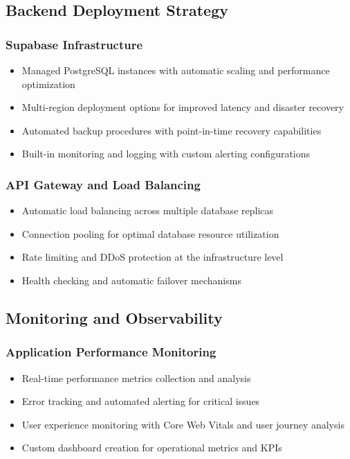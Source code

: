 \subsection{Backend Deployment Strategy}

\subsubsection{Supabase Infrastructure}
\begin{itemize}
\item Managed PostgreSQL instances with automatic scaling and performance optimization
\item Multi-region deployment options for improved latency and disaster recovery
\item Automated backup procedures with point-in-time recovery capabilities
\item Built-in monitoring and logging with custom alerting configurations
\end{itemize}

\subsubsection{API Gateway and Load Balancing}
\begin{itemize}
\item Automatic load balancing across multiple database replicas
\item Connection pooling for optimal database resource utilization
\item Rate limiting and DDoS protection at the infrastructure level
\item Health checking and automatic failover mechanisms
\end{itemize}

\subsection{Monitoring and Observability}

\subsubsection{Application Performance Monitoring}
\begin{itemize}
\item Real-time performance metrics collection and analysis
\item Error tracking and automated alerting for critical issues
\item User experience monitoring with Core Web Vitals and user journey analysis
\item Custom dashboard creation for operational metrics and KPIs
\end{itemize}


